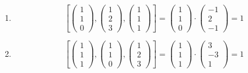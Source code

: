\begin{example}
    \begin{enumerate}
        \item 
        \[
            \left[
                \begin{pmatrix}
                    1\\1\\0
                \end{pmatrix}
                ,
                \begin{pmatrix}
                    1\\2\\3
                \end{pmatrix}
                ,
                \begin{pmatrix}
                    1\\1\\1
                \end{pmatrix}
            \right]=
            \begin{pmatrix}
                1\\1\\0
            \end{pmatrix}
            \cdot
            \begin{pmatrix}
                -1\\2\\-1
            \end{pmatrix}
            =1
        \]
        
        \item 
        \[
            \left[
                \begin{pmatrix}
                    1\\1\\1
                \end{pmatrix}
                ,
                \begin{pmatrix}
                    1\\1\\0
                \end{pmatrix}
                ,
                \begin{pmatrix}
                    1\\2\\3
                \end{pmatrix}
            \right]=
            \begin{pmatrix}
                1\\1\\1
            \end{pmatrix}
            \cdot
            \begin{pmatrix}
                3\\-3\\1
            \end{pmatrix}
            =1
        \]
    \end{enumerate}
\end{example}

